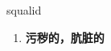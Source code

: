 
\begin{frame}
{\huge squalid}
\begin{center}
\begin{enumerate}\Large
  \item \textbf{污秽的，肮脏的}
\end{enumerate}
\end{center}
\end{frame}
